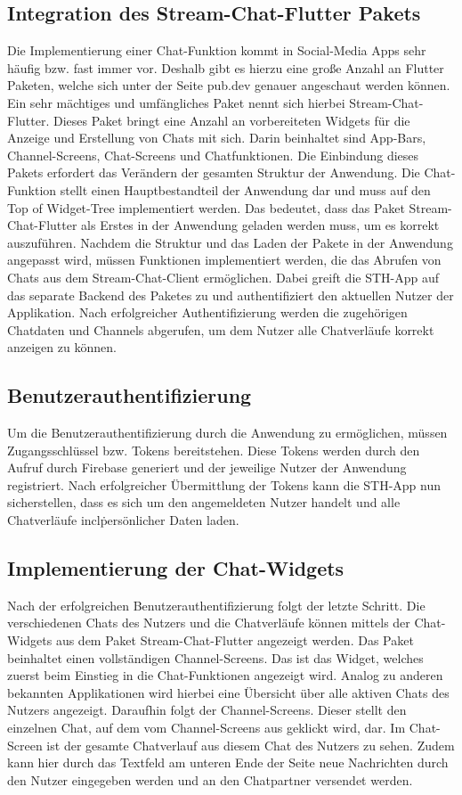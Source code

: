 \subsection{Integration des Stream-Chat-Flutter Pakets}
Die Implementierung einer Chat-Funktion kommt in Social-Media Apps sehr häufig bzw. fast immer vor. Deshalb gibt es hierzu eine große Anzahl an Flutter Paketen, welche sich unter der Seite pub.dev genauer angeschaut werden können. Ein sehr mächtiges und umfängliches Paket nennt sich hierbei Stream-Chat-Flutter. Dieses Paket bringt eine Anzahl an vorbereiteten Widgets für die Anzeige und Erstellung von Chats mit sich. Darin beinhaltet sind App-Bars, Channel-Screens, Chat-Screens und Chatfunktionen. Die Einbindung dieses Pakets erfordert das Verändern der gesamten Struktur der Anwendung. Die Chat-Funktion stellt einen Hauptbestandteil der Anwendung dar und muss auf den Top of Widget-Tree implementiert werden. Das bedeutet, dass das Paket Stream-Chat-Flutter als Erstes in der Anwendung geladen werden muss, um es korrekt auszuführen. Nachdem die Struktur und das Laden der Pakete in der Anwendung angepasst wird, müssen Funktionen implementiert werden, die das Abrufen von Chats aus dem Stream-Chat-Client ermöglichen. Dabei greift die STH-App auf das separate Backend des Paketes zu und authentifiziert den aktuellen Nutzer der Applikation. Nach erfolgreicher Authentifizierung werden die zugehörigen Chatdaten und Channels abgerufen, um dem Nutzer alle Chatverläufe korrekt anzeigen zu können.

\subsection{Benutzerauthentifizierung}
Um die Benutzerauthentifizierung durch die Anwendung zu ermöglichen, müssen Zugangsschlüssel bzw. Tokens bereitstehen. Diese Tokens werden durch den Aufruf durch Firebase generiert und der jeweilige Nutzer der Anwendung registriert. Nach erfolgreicher Übermittlung der Tokens kann die STH-App nun sicherstellen, dass es sich um den angemeldeten Nutzer handelt und alle Chatverläufe incl\. persönlicher Daten laden. 

\subsection{Implementierung der Chat-Widgets}
Nach der erfolgreichen Benutzerauthentifizierung folgt der letzte Schritt. Die verschiedenen Chats des Nutzers und die Chatverläufe können mittels der Chat-Widgets aus dem Paket Stream-Chat-Flutter angezeigt werden. Das Paket beinhaltet einen vollständigen Channel-Screens. Das ist das Widget, welches zuerst beim Einstieg in die Chat-Funktionen angezeigt wird. Analog zu anderen bekannten Applikationen wird hierbei eine Übersicht über alle aktiven Chats des Nutzers angezeigt. Daraufhin folgt der Channel-Screens. Dieser stellt den einzelnen Chat, auf dem vom Channel-Screens aus geklickt wird, dar. Im Chat-Screen ist der gesamte Chatverlauf aus diesem Chat des Nutzers zu sehen. Zudem kann hier durch das Textfeld am unteren Ende der Seite neue Nachrichten durch den Nutzer eingegeben werden und an den Chatpartner versendet werden.

